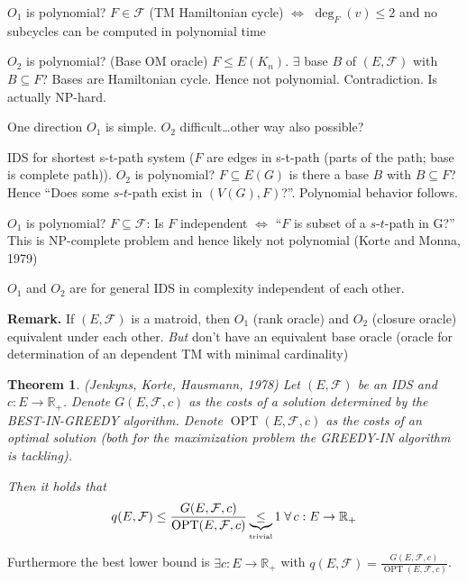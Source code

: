 \documentclass{article}
\newtheorem{theorem}{Theorem}
\newcommand{\gath}[2]{$#1$-$#2$-path} %
\newcommand{\fall}{\;\forall\,}
\begin{document}
$O_1$ is polynomial?
  $F \in \mathcal{F}$ (TM Hamiltonian cycle) $\Leftrightarrow$ $\deg_F(v) \leq 2$ and no subcycles can be computed in polynomial time

$O_2$ is polynomial? (Base OM oracle)
  $F \leq E(K_n)$. $\exists$ base $B$ of $(E, \mathcal{F})$ with $B \subseteq F$?
  Bases are Hamiltonian cycle. Hence not polynomial. Contradiction. Is actually NP-hard.

One direction $O_1$ is simple. $O_2$ difficult\dots other way also possible?

IDS for shortest s-t-path system ($F$ are edges in s-t-path (parts of the path; base is complete path)).
  $O_2$ is polynomial?
    $F \subseteq E(G)$ is there a base $B$ with $B \subseteq F$?
    Hence ``Does some \gath st exist in $(V(G), F)$?''.
    Polynomial behavior follows.

  $O_1$ is polynomial?
    $F \subseteq \mathcal{F}$: Is $F$ independent $\Leftrightarrow$ ``$F$ is subset of a \gath st in G?''
    This is NP-complete problem and hence likely not polynomial (Korte and Monna, 1979)

$O_1$ and $O_2$ are for general IDS in complexity independent of each other.

\textbf{Remark.}
  If $(E, \mathcal{F})$ is a matroid, then $O_1$ (rank oracle) and $O_2$ (closure oracle) equivalent under each other.
  \emph{But} don't have an equivalent base oracle (oracle for determination of an dependent TM with minimal cardinality)


\begin{theorem}
  \label{satz-8.12}
  (Jenkyns, Korte, Hausmann, 1978)
  Let $(E, \mathcal{F})$ be an IDS and $c: E \rightarrow \mathbb{R}_+$. Denote $G(E, \mathcal{F}, c)$ as the costs of a solution determined by the BEST-IN-GREEDY algorithm. Denote $\operatorname{OPT}(E, \mathcal{F}, c)$ as the costs of an optimal solution (both for the maximization problem the GREEDY-IN algorithm is tackling).

  Then it holds that
  \[
      q(E, \mathcal{F})
        \leq \frac{G(E, \mathcal{F}, c)}{\operatorname{OPT}(E, \mathcal{F}, c)}
        \underbrace{\leq}_{\text{\tiny{trivial}}} 1
        \fall c: E \rightarrow \mathbb{R}_+
  \]
\end{theorem}

Furthermore the best lower bound is $\exists c: E \rightarrow \mathbb{R}_+$ with $q(E, \mathcal{F}) = \frac{G(E, \mathcal{F}, c)}{\operatorname{OPT}(E, \mathcal{F}, c)}$.
\end{document}
